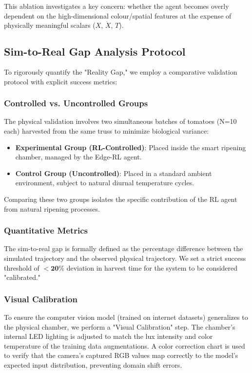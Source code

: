 \documentclass[conference]{IEEEtran}
\begin{document}
    \noindent This ablation investigates a key concern: whether the agent becomes overly dependent on the high-dimensional colour/spatial features at the expense of physically meaningful scalars ($X$, $\dot{X}$, $T$).

    \subsection{Sim-to-Real Gap Analysis Protocol}
    \label{sec:sim2real_protocol}

    To rigorously quantify the "Reality Gap," we employ a comparative validation protocol with explicit success metrics:

    \subsubsection{Controlled vs. Uncontrolled Groups}
    The physical validation involves two simultaneous batches of tomatoes (N=10 each) harvested from the same truss to minimize biological variance:
    \begin{itemize}
        \item \textbf{Experimental Group (RL-Controlled)}: Placed inside the smart ripening chamber, managed by the Edge-RL agent.
        \item \textbf{Control Group (Uncontrolled)}: Placed in a standard ambient environment, subject to natural diurnal temperature cycles.
    \end{itemize}
    Comparing these two groups isolates the specific contribution of the RL agent from natural ripening processes.

    \subsubsection{Quantitative Metrics}
    The sim-to-real gap is formally defined as the percentage difference between the simulated trajectory and the observed physical trajectory. We set a strict success threshold of $\mathbf{<20\%}$ deviation in harvest time for the system to be considered "calibrated."

    \subsubsection{Visual Calibration}
    To ensure the computer vision model (trained on internet datasets) generalizes to the physical chamber, we perform a "Visual Calibration" step. The chamber's internal LED lighting is adjusted to match the lux intensity and color temperature of the training data augmentations. A color correction chart is used to verify that the camera's captured RGB values map correctly to the model's expected input distribution, preventing domain shift errors.
\end{document}
